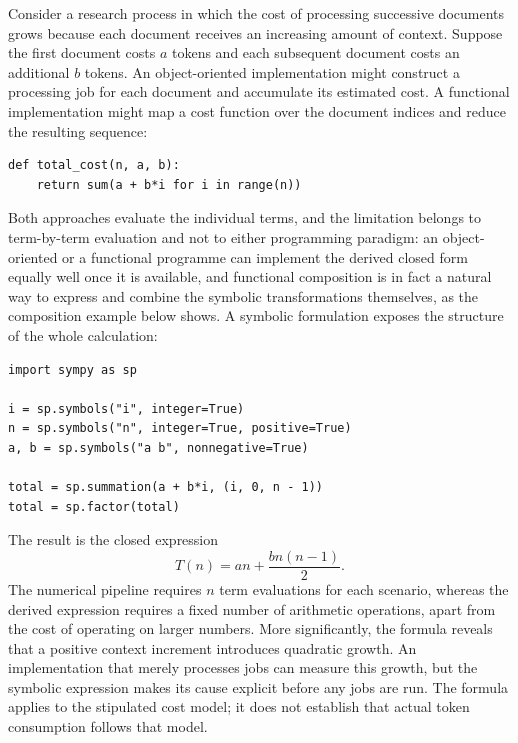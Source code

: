 \documentclass[11pt]{article}
\theoremstyle{remark}
\begin{document}
Consider a research process in which the cost of processing successive documents grows because each document receives an increasing amount of context. Suppose the first document costs $a$ tokens and each subsequent document costs an additional $b$ tokens. An object-oriented implementation might construct a processing job for each document and accumulate its estimated cost. A functional implementation might map a cost function over the document indices and reduce the resulting sequence:
\begin{verbatim}
def total_cost(n, a, b):
    return sum(a + b*i for i in range(n))
\end{verbatim}
Both approaches evaluate the individual terms, and the limitation belongs to term-by-term evaluation and not to either programming paradigm: an object-oriented or a functional programme can implement the derived closed form equally well once it is available, and functional composition is in fact a natural way to express and combine the symbolic transformations themselves, as the composition example below shows. A symbolic formulation exposes the structure of the whole calculation:
\begin{verbatim}
import sympy as sp

i = sp.symbols("i", integer=True)
n = sp.symbols("n", integer=True, positive=True)
a, b = sp.symbols("a b", nonnegative=True)

total = sp.summation(a + b*i, (i, 0, n - 1))
total = sp.factor(total)
\end{verbatim}
The result is the closed expression
\begin{equation}
T(n) = an + \frac{bn(n-1)}{2}.
\end{equation}
The numerical pipeline requires $n$ term evaluations for each scenario, whereas the derived expression requires a fixed number of arithmetic operations, apart from the cost of operating on larger numbers. More significantly, the formula reveals that a positive context increment introduces quadratic growth. An implementation that merely processes jobs can measure this growth, but the symbolic expression makes its cause explicit before any jobs are run. The formula applies to the stipulated cost model; it does not establish that actual token consumption follows that model.
\end{document}
